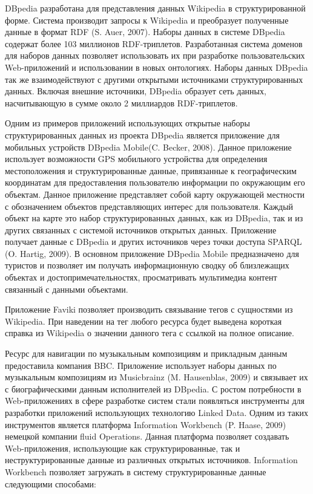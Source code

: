 DBpedia разработана для представления данных Wikipedia в структурированной форме. Система производит запросы к Wikipedia и преобразует полученные данные в формат RDF (S. Auer, 2007). Наборы данных в системе DBpedia содержат более 103 миллионов RDF-триплетов. Разработанная система доменов для наборов данных позволяет использовать их при разработке пользовательских Web-приложений и использовании в новых онтологиях. Наборы данных DBpedia так же взаимодействуют с другими открытыми источниками структурированных данных. Включая внешние источники,  DBpedia образует сеть данных, насчитывающую в сумме около 2 миллиардов RDF-триплетов.  

Одним из примеров приложений использующих открытые наборы структурированных данных из проекта DBpedia является приложение для мобильных устройств DBpedia Mobile(C. Becker, 2008). Данное приложение использует возможности GPS мобильного устройства для определения местоположения и структурированные данные, привязанные к географическим координатам для предоставления пользователю информации по окружающим его объектам. Данное приложение представляет собой карту окружающей местности с обозначением объектов представляющих интерес для пользователя. Каждый объект на карте это набор структурированных данных, как из DBpedia, так и из других связанных с системой источников открытых данных. Приложение получает данные с DBpedia и других источников через точки доступа SPARQL (O. Hartig, 2009). В основном приложение DBpedia Mobile предназначено для туристов и позволяет им получать информационную сводку об близлежащих объектах и достопримечательностях, просматривать мультимедиа контент связанный с данными объектами. 

Приложение Faviki позволяет производить связывание тегов с сущностями из Wikipedia. При наведении на тег любого ресурса будет выведена короткая справка из Wikipedia о значении данного тега с ссылкой на полное описание. 

Ресурс для навигации по музыкальным композициям и прикладным данным предоставила компания BBC. Приложение использует наборы данных по музыкальным композициям из Musicbrainz (M. Hausenblas, 2009) и связывает их с биографическими данным исполнителей из  DBpedia. 
С ростом потребности в Web-приложениях в сфере разработке систем стали появляться инструменты для разработки приложений использующих технологию Linked Data. Одним из таких инструментов является платформа Information Workbench (P. Haase, 2009)  немецкой компании fluid Operations. Данная платформа позволяет создавать Web-приложения, использующие как структурированные, так и неструктурированные данные из различных открытых источников. Information Workbench позволяет загружать в систему структурированные данные следующими способами:


